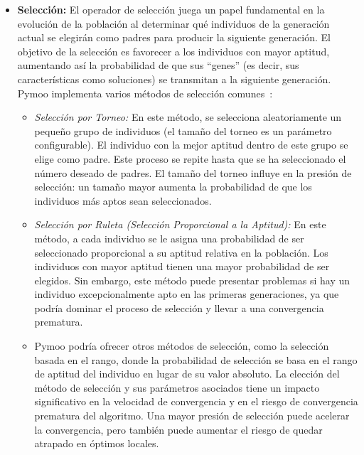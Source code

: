 \begin{itemize}[label=\textbullet, leftmargin=*]
    \item \textbf{Selección:} El operador de selección juega un papel fundamental en la evolución de la población al determinar qué individuos de la generación actual se elegirán como padres para producir la siguiente generación. El objetivo de la selección es favorecer a los individuos con mayor aptitud, aumentando así la probabilidad de que sus ``genes'' (es decir, sus características como soluciones) se transmitan a la siguiente generación. Pymoo implementa varios métodos de selección comunes~\cite{goldberg1989, eiben2015}:
    \begin{itemize}[label=\textbullet, leftmargin=*] %
        \item \textit{Selección por Torneo:} En este método, se selecciona aleatoriamente un pequeño grupo de individuos (el tamaño del torneo es un parámetro configurable). El individuo con la mejor aptitud dentro de este grupo se elige como padre. Este proceso se repite hasta que se ha seleccionado el número deseado de padres. El tamaño del torneo influye en la presión de selección: un tamaño mayor aumenta la probabilidad de que los individuos más aptos sean seleccionados.
        \item \textit{Selección por Ruleta (Selección Proporcional a la Aptitud):} En este método, a cada individuo se le asigna una probabilidad de ser seleccionado proporcional a su aptitud relativa en la población. Los individuos con mayor aptitud tienen una mayor probabilidad de ser elegidos. Sin embargo, este método puede presentar problemas si hay un individuo excepcionalmente apto en las primeras generaciones, ya que podría dominar el proceso de selección y llevar a una convergencia prematura.
        \item Pymoo podría ofrecer otros métodos de selección, como la selección basada en el rango, donde la probabilidad de selección se basa en el rango de aptitud del individuo en lugar de su valor absoluto. La elección del método de selección y sus parámetros asociados tiene un impacto significativo en la velocidad de convergencia y en el riesgo de convergencia prematura del algoritmo. Una mayor presión de selección puede acelerar la convergencia, pero también puede aumentar el riesgo de quedar atrapado en óptimos locales.
    \end{itemize}


\end{itemize}
